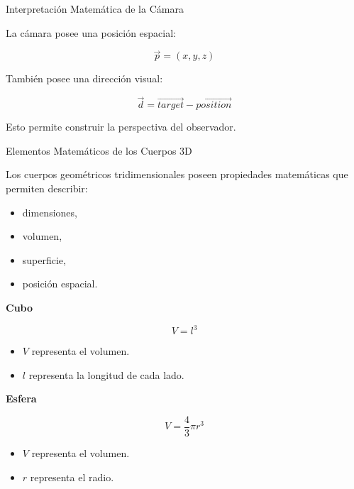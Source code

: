 \documentclass{beamer}
\begin{document}
\begin{frame}{Interpretación Matemática de la Cámara}

La cámara posee una posición espacial:

$$
\vec{p}=(x,y,z)
$$

También posee una dirección visual:

$$
\vec{d}=\vec{target}-\vec{position}
$$

\vspace{0.4cm}

Esto permite construir la perspectiva del observador.

\end{frame}

\begin{frame}{Elementos Matemáticos de los Cuerpos 3D}

Los cuerpos geométricos tridimensionales poseen propiedades matemáticas que permiten describir:

\begin{itemize}
    \item dimensiones,
    \item volumen,
    \item superficie,
    \item posición espacial.
\end{itemize}

\vspace{0.2cm}

\textbf{Cubo}

$$
V=l^3
$$

\begin{itemize}
    \item $V$ representa el volumen.
    \item $l$ representa la longitud de cada lado.
\end{itemize}

\vspace{0.2cm}

\textbf{Esfera}

$$
V=\frac{4}{3}\pi r^3
$$

\begin{itemize}
    \item $V$ representa el volumen.
    \item $r$ representa el radio.
\end{itemize}

\end{frame}
\end{document}
